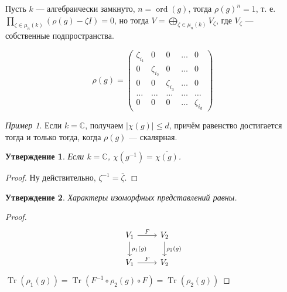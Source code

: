 \documentclass{article}
\newtheorem*{statement}{Утверждение}
\theoremstyle{definition}
\theoremstyle{remark}
\newtheorem*{example}{Пример}
\DeclareMathOperator{\Tr}{Tr}
\DeclareMathOperator{\ord}{ord}
\renewcommand{\C}{\mathbb{C}}
\begin{document}
Пусть $k$ --- алгебраически замкнуто, $n = \ord(g)$, тогда $\rho(g)^n = 1$, т. е. $\prod\limits_{\zeta \in \mu_n(k)}(\rho(g) - \zeta I) = 0$, но тогда $V = \bigoplus\limits_{\zeta \in \mu_n(k)} V_{\zeta}$, где $V_{\zeta}$ --- собственные подпространства.

\begin{equation*}
\rho(g) = 
\begin{pmatrix}
\zeta_{i_1} & 0 & 0 & \ldots & 0 \\ 
0 & \zeta_{i_2} & 0 & \ldots & 0 \\
0 & 0 & \zeta_{i_3} & \ldots & 0 \\
\ldots & \ldots & \ldots & \ldots & \ldots \\
0 & 0 & 0 & \ldots & \zeta_{i_d}
\end{pmatrix}
\end{equation*}

\begin{example}
Если $k = \C$, получаем $|\chi(g)| \le d$, причём равенство достигается тогда и только тогда, когда $\rho(g)$ --- скалярная.
\end{example}

\begin{statement}
Если $k = \C$, $\chi(g^{-1}) = \overline{\chi(g)}$.
\end{statement}
\begin{proof}
Ну действительно, $\zeta^{-1} = \bar{\zeta}$.
\end{proof}

\begin{statement}
Характеры изоморфных представлений равны.
\end{statement}
\begin{proof}
\begin{equation*}
\begin{tikzcd}
V_1 \dar{\rho_1(g)} \rar{F} & V_2 \dar{\rho_2(g)} \\
V_1 \rar{F} & V_2 
\end{tikzcd}
\end{equation*}
$\Tr(\rho_1(g)) = \Tr(F^{-1} \circ \rho_2(g) \circ F) = \Tr(\rho_2(g))$
\end{proof}
\end{document}
